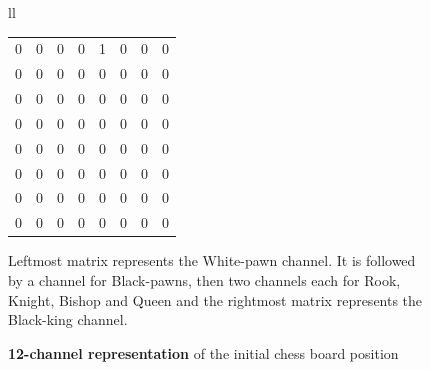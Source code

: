 \begin{enumerate}
\begin{figure}[H]
\begin{longtable}[width=\textwidth]{ll}
\small
    \begin{tabular}[width=0.33\textwidth]{|llllllll|}
    \hline
    0  & 0  & 0  & 0  & 1  & 0  & 0  & 0  \\
    0  & 0  & 0  & 0  & 0  & 0  & 0  & 0  \\
    0  & 0  & 0  & 0  & 0  & 0  & 0  & 0  \\
    0  & 0  & 0  & 0  & 0  & 0  & 0  & 0  \\
    0  & 0  & 0  & 0  & 0  & 0  & 0  & 0  \\
    0  & 0  & 0  & 0  & 0  & 0  & 0  & 0  \\
    0  & 0  & 0  & 0  & 0  & 0  & 0  & 0  \\
    0  & 0  & 0  & 0  & 0  & 0  & 0  & 0  \\ \hline
    \end{tabular}
  \end{longtable}
\caption{\textbf{12-channel representation} of the initial chess board position}
\small
Leftmost matrix represents the White-pawn channel. It is followed by a 
channel for Black-pawns, then two channels each for Rook, Knight, Bishop and 
Queen and the rightmost matrix represents the Black-king channel.
\end{figure}

\end{enumerate}


